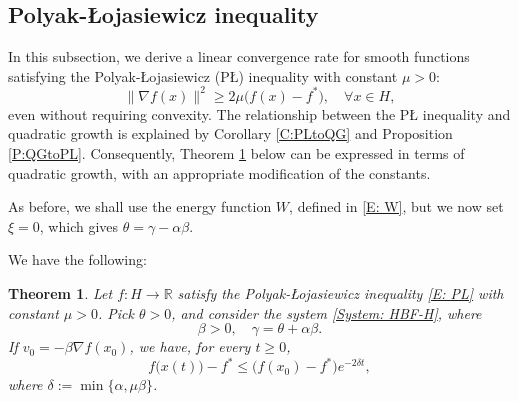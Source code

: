 \documentclass[pdflatex,sn-mathphys-num]{sn-jnl}
\theoremstyle{thmstyleone}
\newtheorem{theorem}{Theorem}
\theoremstyle{thmstyletwo}
\theoremstyle{thmstylethree}
\newcommand{\R}{\mathbb{R}}
\begin{document}
\subsection{Polyak-\L ojasiewicz inequality}  \label{SS:quadnonunique}
In this subsection, we derive a linear convergence rate for smooth functions satisfying the Polyak-\L ojasiewicz (P{\L}) inequality with constant $\mu>0$: 
\begin{equation}\label{E: PL}
\|\nabla f(x)\|^2 \ge 2\mu\big(f(x)-f^*\big),\quad\forall x\in H,
\end{equation}
even without requiring convexity. The relationship between the P{\L} inequality and quadratic growth is explained by Corollary \ref{C:PLtoQG} and Proposition \ref{P:QGtoPL}. Consequently, Theorem \ref{T:onlyPL} below can be expressed in terms of quadratic growth, with an appropriate modification of the constants.

As before, we shall use the energy function $W$, defined in \eqref{E: W}, but we now set $\xi=0$, which gives $\theta=\gamma-\alpha\beta$.

We have the following:

\begin{theorem} \label{T:onlyPL}
Let $f:H\to\R$ satisfy the Polyak-\L ojasiewicz inequality \eqref{E: PL} with constant $\mu>0$. Pick $\theta>0$, and consider the system \eqref{System: HBF-H}, where 
$$\beta>0,\quad \gamma=\theta+\alpha\beta. $$
If $v_0 = -\beta\nabla f(x_0)$, we have, for every $t\ge 0$,
$$ f\big( x(t) \big) - f^* \le \big( f(x_0) - f^* \big) e^{-2\delta t },$$
where $\delta:=\min\{\alpha,\mu\beta\}$.
\end{theorem}
\end{document}
